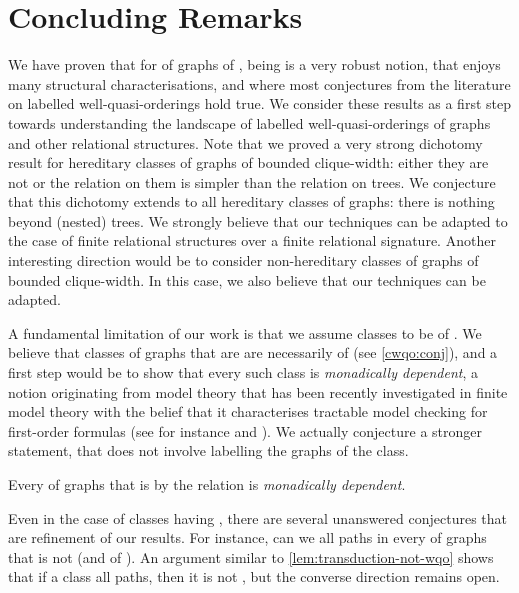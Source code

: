 \section{Concluding Remarks}
\label{sec:conclusion}

We have proven that for  of graphs of , being  is a very robust notion,
that enjoys many structural characterisations, and where most conjectures from
the literature on labelled well-quasi-orderings hold true. We consider these
results as a first step towards understanding the landscape of labelled
well-quasi-orderings of graphs and other relational structures.
Note that we proved a very strong dichotomy result for hereditary
classes of graphs of bounded clique-width: either they are not
 or the  relation on them is
simpler than the  relation on trees. We conjecture that this
dichotomy extends to all hereditary classes of graphs: there is nothing beyond
(nested) trees.
We strongly believe that our techniques can be adapted to the case
of finite relational structures over a finite relational signature. Another
interesting direction would be to consider non-hereditary classes of graphs of
bounded clique-width. In this case, we also believe that our techniques can be
adapted.

A fundamental limitation of our work is that we assume classes to be of
. We believe that classes of graphs that are
 are necessarily of  (see
\cref{cwqo:conj}), and a first step would be to show that every
such class is \emph{monadically dependent}, a notion originating from 
model theory \cite{baldwin85}
that has been recently investigated in finite model theory 
with the belief that it characterises tractable model checking for 
first-order formulas (see for instance \cite{dreier24} and \cite{dreier2024flipbreakability}).
We actually conjecture a stronger statement, that does not involve labelling
the graphs of the class.

\begin{conjecture}
  \label{conj:wqo-mon-dep}
  Every  of graphs that is 
   by the  relation is \emph{monadically dependent}.
\end{conjecture}

Even in the case of classes having , there are several
unanswered conjectures that are refinement of our results. For instance, can we
 all paths in every  of graphs
that is not  (and of ). An argument similar to \cref{lem:transduction-not-wqo} shows
that if a class  all paths, then it is not
, but the converse direction remains open.

